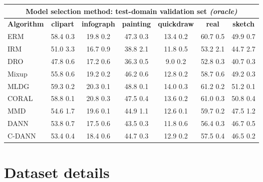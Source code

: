 \documentclass{article}
\begin{document}
\begin{center}
\begin{tabular}{lcccccc}
\toprule
\multicolumn{7}{c}{\textbf{Model selection method: test-domain validation set \textit{(oracle)}}} \\
\midrule
\textbf{Algorithm}    & \textbf{clipart} & \textbf{infograph} & \textbf{painting} & \textbf{quickdraw} & \textbf{real} & \textbf{sketch}     \\
\midrule
ERM               &         58.4  0.3        &     19.8  0.2     &        47.3  0.3      &       13.4  0.2      &       60.7  0.5      &       49.9  0.7 \\            
IRM               &         51.0  3.3        &     16.7  0.9     &        38.8  2.1      &       11.8  0.5      &       53.2  2.1      &       44.7  2.7 \\            
DRO         &         47.8  0.6        &     17.2  0.6     &        36.3  0.5     &        9.0  0.2      &        52.8  0.3      &       40.7  0.3 \\            
Mixup             &         55.8  0.6        &     19.2  0.2     &        46.2  0.6      &       12.8  0.2      &       58.7  0.6      &       49.2  0.3 \\            
MLDG              &         59.3  0.2        &     20.3  0.1     &        48.8  0.1      &       14.0  0.3      &       61.2  0.2      &       51.2  0.1 \\            
CORAL             &         58.8  0.1        &     20.8  0.3     &        47.5  0.4      &       13.6  0.2      &       61.0  0.3      &       50.8  0.4 \\            
MMD               &         54.6  1.7        &     19.6  0.1     &        44.9  1.1      &       12.6  0.1      &       59.7  0.2      &       47.5  1.2 \\            
DANN               &         53.8  0.7        &     17.5  0.6     &        43.5  0.3      &       11.8  0.6      &       56.4  0.3      &       46.7  0.5 \\            
C-DANN           &         53.4  0.4        &     18.4  0.6     &        44.7  0.3      &       12.9  0.2      &       57.5  0.4      &       46.5  0.2 \\            
\bottomrule
\end{tabular}
\end{center}


\clearpage
\newpage

\section{Dataset details}
\label{sec:dataset_details}
\end{document}
